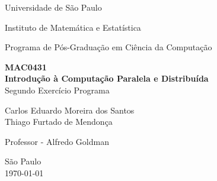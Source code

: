 \documentclass[brazil, a4paper,12pt]{article}
\begin{document}
\begin{titlepage}

  \vfill

  \begin{center}
    \begin{large}
      Universidade de São Paulo
    \end{large}
  \end{center}

  \begin{center}
    \begin{large}
      Instituto de Matemática e Estatística
    \end{large}
  \end{center}

  \begin{center}
    \begin{large}
      Programa de Pós-Graduação em Ciência da Computação
    \end{large}
  \end{center}

  \vfill

  \begin{center}
    \begin{Large}
        \textbf{MAC0431}\\
        \textbf{Introdução à Computação Paralela e Distribuída}\\
          Segundo Exercício Programa\\
    \end{Large}
  \end{center}


  \vfill

  \begin{center}
    \begin{large}
      Carlos Eduardo Moreira dos Santos\\
      Thiago Furtado de Mendonça
    \end{large}
  \end{center}

  \begin{center}
    \begin{large}
      Professor - Alfredo Goldman\\
    \end{large}
  \end{center}

  \vfill

  \begin{center}
    \begin{large}
      São Paulo \\
      \today \\
    \end{large}
  \end{center}

\clearpage
\tableofcontents 
\end{titlepage}
\end{document}
